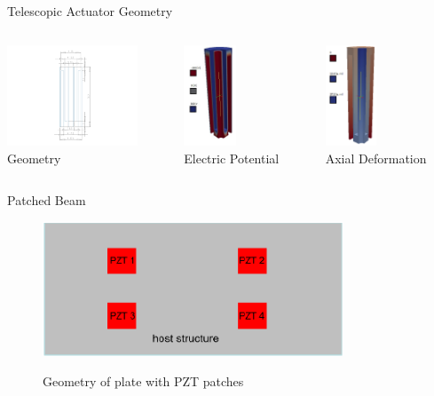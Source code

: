 \documentclass{beamer}
\begin{document}
\begin{frame}{Telescopic Actuator Geometry}
     \begin{columns}[t] %
     \begin{column}[T]{3cm} %
\includegraphics[trim={8cm 0 0cm 0},clip,height=3cm]{../images/PZT_586_Geometry.pdf}\\  
Geometry
     \end{column}
     \begin{column}[T]{3cm}  
\includegraphics[height=3cm]{../images/PZT_586_Epot_Distribution}\\
Electric Potential
     \end{column}
     \begin{column}[T]{4cm}  
\includegraphics[height=3cm]{../images/PZT_586_Axial_Deformation}\\
Axial Deformation
     \end{column}
          
     \end{columns}    
\end{frame}

\begin{frame}{Patched Beam} 
\begin{figure}
\includegraphics[height=4cm]{../images/Patched_Beam_Geometry}\\
\caption{Geometry of plate with PZT patches}
\end{figure}
\end{frame}
\end{document}
